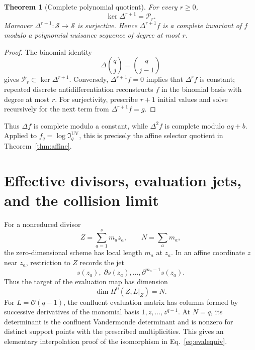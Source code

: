 \documentclass[aps,prd,preprint,nofootinbib,superscriptaddress]{revtex4-2}
\newtheorem{theorem}{Theorem}[section]
\theoremstyle{definition}
\theoremstyle{remark}
\newcommand{\UV}{\mathrm{UV}}
\newcommand{\cI}{\mathfrak I}
\newcommand{\cO}{\mathcal O}
\begin{document}
\begin{theorem}[Complete polynomial quotient]
For every $r\ge0$,
\begin{equation}
\ker\Delta^{r+1}=\mathcal P_r.
\label{eq:kernel-difference}
\end{equation}
Moreover $\Delta^{r+1}:\mathcal S\to\mathcal S$ is surjective.  Hence
$\Delta^{r+1}f$ is a complete invariant of $f$ modulo a polynomial nuisance
sequence of degree at most $r$.
\end{theorem}

\begin{proof}
The binomial identity
\begin{equation}
\Delta\binom qj=\binom q{j-1}
\end{equation}
gives $\mathcal P_r\subset\ker\Delta^{r+1}$.  Conversely,
$\Delta^{r+1}f=0$ implies that $\Delta^rf$ is constant; repeated discrete
antidifferentiation reconstructs $f$ in the binomial basis with degree at most
$r$.  For surjectivity, prescribe $r+1$ initial values and solve recursively
for the next term from $\Delta^{r+1}f=g$.
\end{proof}

Thus $\Delta f$ is complete modulo a constant, while $\Delta^2 f$ is complete
modulo $aq+b$.  Applied to $f_q=\log\cI_q^{\UV}$, this is precisely the affine
selector quotient in Theorem~\ref{thm:affine}.

\section{Effective divisors, evaluation jets, and the collision limit}
\label{app:jets}

For a nonreduced divisor
\begin{equation}
Z=\sum_{a=1}^s m_a z_a,
\qquad
N=\sum_am_a,
\end{equation}
the zero-dimensional scheme has local length $m_a$ at $z_a$.  In an affine
coordinate $z$ near $z_a$, restriction to $Z$ records the jet
\begin{equation}
s(z_a),\;
\partial s(z_a),\ldots,
\partial^{m_a-1}s(z_a).
\end{equation}
Thus the target of the evaluation map has dimension
\begin{equation}
\dim H^0(Z,L|_Z)=N.
\end{equation}
For $L=\cO(q-1)$, the confluent evaluation matrix has columns formed by
successive derivatives of the monomial basis
$1,z,\ldots,z^{q-1}$.  At $N=q$, its determinant is the confluent
Vandermonde determinant and is nonzero for distinct support points with the
prescribed multiplicities.  This gives an elementary interpolation proof of
the isomorphism in Eq.~\eqref{eq:evalequiv}.
\end{document}
